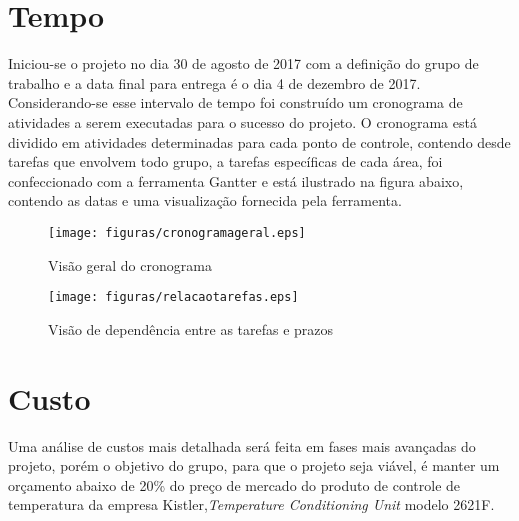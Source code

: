 \section{Tempo}

Iniciou-se o projeto no dia 30 de agosto de 2017 com a definição do grupo de trabalho e a data final para entrega é o dia 4 de dezembro de 2017. Considerando-se esse intervalo de tempo foi construído um cronograma de atividades a serem executadas para o sucesso do projeto.
O cronograma está dividido em atividades determinadas para cada ponto de controle, contendo desde tarefas que envolvem todo grupo, a tarefas específicas de cada área, foi confeccionado com a ferramenta Gantter e está ilustrado na figura abaixo, contendo as datas e uma visualização fornecida pela ferramenta.

\begin{figure}[!htb]
   \centering
   \texttt{[image: figuras/cronogramageral.eps]}
   \caption{Visão geral do cronograma}
\end{figure}


\begin{figure}[!htb]
   \centering
   \texttt{[image: figuras/relacaotarefas.eps]}
   \caption{Visão de dependência entre as tarefas e prazos}
\end{figure}

\section{Custo}
Uma análise de custos mais detalhada será feita em fases mais avançadas do projeto, porém o objetivo do grupo, para que o projeto seja viável, é manter um orçamento abaixo de 20\% do preço de mercado do produto de controle de temperatura da empresa Kistler,\textsl{Temperature Conditioning Unit} modelo 2621F.
     

